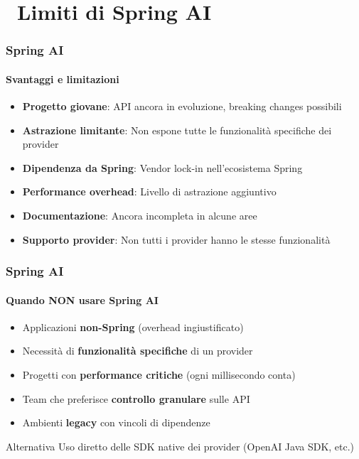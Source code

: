 \section{\faThumbsDown\ Limiti di Spring AI} %
\label{sec:spring-ai-cons}

\begin{frame}[t] \frametitle{Spring AI}
    \framesubtitle{Svantaggi e limitazioni}
    \begin{itemize}[leftmargin=10pt,align=right]
        \item[\alert{\faExclamationTriangle}] \textbf{Progetto giovane}: API ancora in evoluzione, breaking changes possibili
        \item[\alert{\faExclamationTriangle}] \textbf{Astrazione limitante}: Non espone tutte le funzionalità specifiche dei provider
        \item[\alert{\faExclamationTriangle}] \textbf{Dipendenza da Spring}: Vendor lock-in nell'ecosistema Spring
        \item[\alert{\faExclamationTriangle}] \textbf{Performance overhead}: Livello di astrazione aggiuntivo
        \item[\alert{\faExclamationTriangle}] \textbf{Documentazione}: Ancora incompleta in alcune aree
        \item[\alert{\faExclamationTriangle}] \textbf{Supporto provider}: Non tutti i provider hanno le stesse funzionalità
    \end{itemize}
\end{frame}

\begin{frame}[t] \frametitle{Spring AI}
    \framesubtitle{Quando NON usare Spring AI}
    \begin{itemize}[leftmargin=10pt,align=right]
        \item[\alert{\faTimesCircle}] Applicazioni \textbf{non-Spring} (overhead ingiustificato)
        \item[\alert{\faTimesCircle}] Necessità di \textbf{funzionalità specifiche} di un provider
        \item[\alert{\faTimesCircle}] Progetti con \textbf{performance critiche} (ogni millisecondo conta)
        \item[\alert{\faTimesCircle}] Team che preferisce \textbf{controllo granulare} sulle API
        \item[\alert{\faTimesCircle}] Ambienti \textbf{legacy} con vincoli di dipendenze
    \end{itemize}
    
    \vspace{1cm}
    \begin{block}{Alternativa}
        Uso diretto delle SDK native dei provider (OpenAI Java SDK, etc.)
    \end{block}
\end{frame}
%
